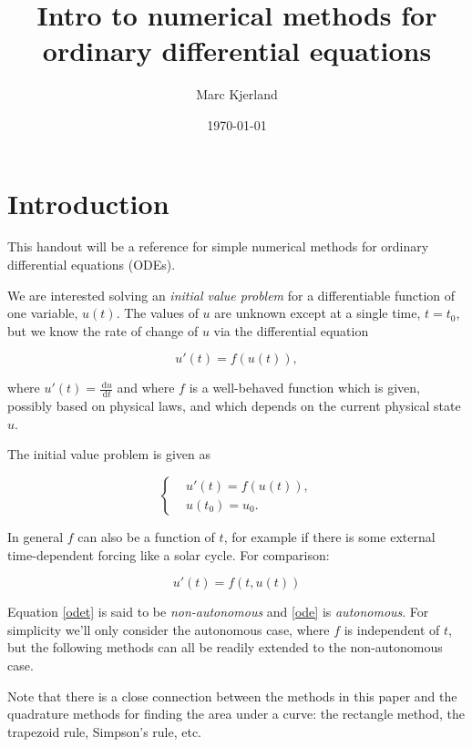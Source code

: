 \documentclass{article}
\title{Intro to numerical methods for ordinary differential equations}
\author{Marc Kjerland}
\date{\today}
\newcommand{\ud}{\,\mathrm{d}}
\begin{document}
\maketitle

\section{Introduction}

This handout will be a reference for simple numerical methods for ordinary differential equations (ODEs).

We are interested solving an \emph{initial value problem} for a differentiable function of one variable, $u(t)$.
The values of $u$ are unknown except at a single time, $t=t_0$, but we know
the rate of change of $u$ via the differential equation

\begin{equation}
    u'(t) = f(u(t)),
    \label{ode}
\end{equation}

where $ u'(t) = \frac{\ud u}{\ud t}$ and where $f$ is a well-behaved function which is given, possibly based on physical laws, and which depends on the current physical state $u$.

The initial value problem is given as

\begin{equation}
    \left\{\begin{split}
            &u'(t) = f(u(t)), \\
            &u(t_0) = u_0.
    \end{split}\right .
    \label{ivp}
\end{equation}

In general $f$ can also be a function of $t$, for example if there is some external
time-dependent forcing like a solar cycle. For comparison:

\begin{equation}
    u'(t) = f(t,u(t))
    \label{odet}
\end{equation}

Equation \eqref{odet} is said to be \emph{non-autonomous} and \eqref{ode} is \emph{autonomous}.
For simplicity we'll only consider the autonomous case, where $f$ is independent of $t$,
but the following methods can all be readily
extended to the non-autonomous case.

Note that there is a close connection between the methods
in this paper
and the quadrature methods for finding the area under a curve:
the rectangle method, the trapezoid rule, Simpson's rule, etc.
\end{document}

